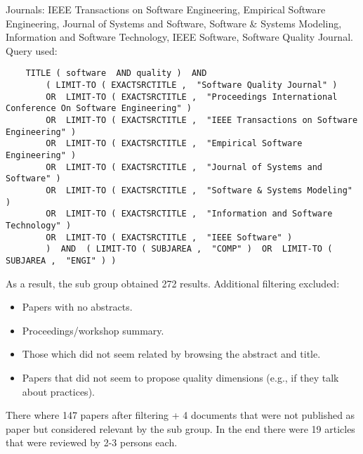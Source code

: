 Journals: IEEE Transactions on Software Engineering, Empirical Software Engineering, Journal of Systems and Software, Software \& Systems Modeling, Information and Software Technology, IEEE Software, Software Quality Journal. Query used:

\tiny
\begin{verbatim}
    TITLE ( software  AND quality )  AND  
        ( LIMIT-TO ( EXACTSRCTITLE ,  "Software Quality Journal" )  
        OR  LIMIT-TO ( EXACTSRCTITLE ,  "Proceedings International Conference On Software Engineering" ) 
        OR  LIMIT-TO ( EXACTSRCTITLE ,  "IEEE Transactions on Software Engineering" )
        OR  LIMIT-TO ( EXACTSRCTITLE ,  "Empirical Software Engineering" ) 
        OR  LIMIT-TO ( EXACTSRCTITLE ,  "Journal of Systems and Software" ) 
        OR  LIMIT-TO ( EXACTSRCTITLE ,  "Software & Systems Modeling" ) 
        OR  LIMIT-TO ( EXACTSRCTITLE ,  "Information and Software Technology" )  
        OR  LIMIT-TO ( EXACTSRCTITLE ,  "IEEE Software" )   
        )  AND  ( LIMIT-TO ( SUBJAREA ,  "COMP" )  OR  LIMIT-TO ( SUBJAREA ,  "ENGI" ) )  
\end{verbatim}
\small

As a result, the sub group obtained 272 results. Additional filtering excluded:

\begin{itemize}
    \item Papers with no abstracts.
    \item Proceedings/workshop summary.
    \item Those which did not seem related by browsing the abstract and title.
    \item Papers that did not seem to propose quality dimensions (e.g., if they talk about practices).
\end{itemize}

There where 147 papers after filtering + 4 documents that were not published as paper but considered relevant by the sub group. In the end there were 19 articles that were reviewed by 2-3 persons each.

